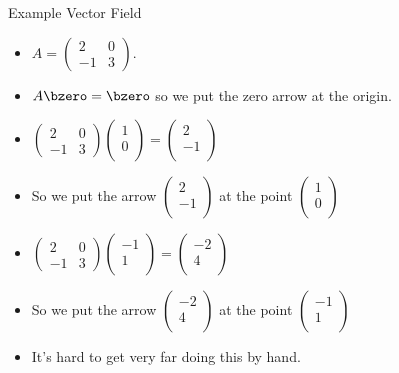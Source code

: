 \documentclass{beamer}
\begin{document}
\begin{frame}{Example Vector Field}

\begin{itemize}
\item $A=
\begin{pmatrix}
2 & 0 \\
-1 & 3
\end{pmatrix}.
$
\item $A\bzero=\bzero$ so we put the zero arrow at the origin.
\item
$
\begin{pmatrix}
2 & 0 \\
-1 & 3
\end{pmatrix}
\begin{pmatrix}
1 \\
0 \\
\end{pmatrix}
=
\begin{pmatrix}
2 \\
-1 \\
\end{pmatrix}
$
\item
So we put the arrow
$
\begin{pmatrix}
2 \\
-1 \\
\end{pmatrix}
$
at the point
$
\begin{pmatrix}
1 \\
0 \\
\end{pmatrix}
$
\item
$
\begin{pmatrix}
2 & 0 \\
-1 & 3
\end{pmatrix}
\begin{pmatrix}
-1 \\
 1 \\
\end{pmatrix}
=
\begin{pmatrix}
-2 \\
4 \\
\end{pmatrix}
$
\item
So we put the arrow
$
\begin{pmatrix}
-2 \\
4 \\
\end{pmatrix}
$
at the point
$
\begin{pmatrix}
-1 \\
1 \\
\end{pmatrix}
$
\item It's hard to get very far doing this by hand.
\end{itemize}
\end{frame}
\end{document}
